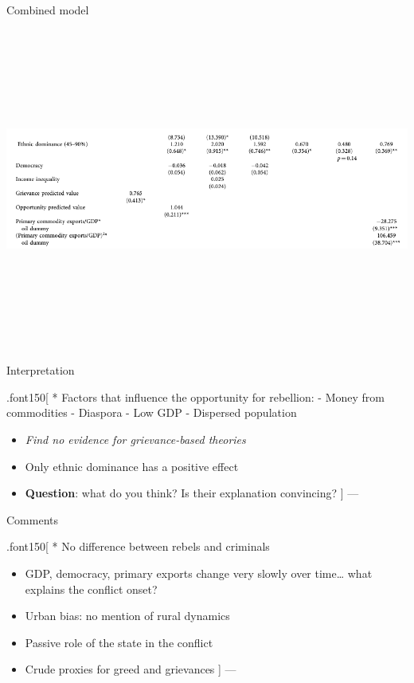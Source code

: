 \documentclass[ignorenonframetext,]{beamer}
\begin{document}
\begin{frame}{Combined model}

\begin{block}{\includegraphics[width=1100px,height=400px]{ch07}}

\end{block}

\end{frame}

\begin{frame}{Interpretation}

.font150{[} * Factors that influence the opportunity for rebellion: -
Money from commodities - Diaspora - Low GDP - Dispersed population

\begin{itemize}
\item
  \emph{Find no evidence for grievance-based theories}
\item
  Only ethnic dominance has a positive effect
\item
  \textbf{Question}: what do you think? Is their explanation convincing?
  {]} ---
\end{itemize}

\end{frame}

\begin{frame}{Comments}

.font150{[} * No difference between rebels and criminals

\begin{itemize}
\item
  GDP, democracy, primary exports change very slowly over time\ldots{}
  what explains the conflict onset?
\item
  Urban bias: no mention of rural dynamics
\item
  Passive role of the state in the conflict
\item
  Crude proxies for greed and grievances {]} ---
\end{itemize}

\end{frame}
\end{document}
